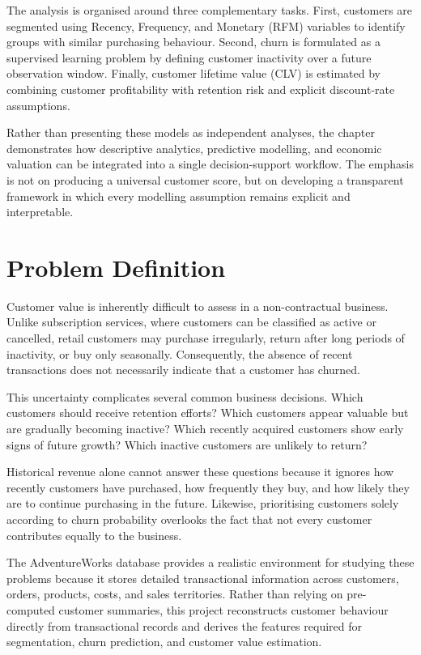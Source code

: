 \documentclass[
  12pt,
  letterpaper,
]{book}
\begin{document}
The analysis is organised around three complementary tasks. First,
customers are segmented using Recency, Frequency, and Monetary (RFM)
variables to identify groups with similar purchasing behaviour. Second,
churn is formulated as a supervised learning problem by defining
customer inactivity over a future observation window. Finally, customer
lifetime value (CLV) is estimated by combining customer profitability
with retention risk and explicit discount-rate assumptions.

Rather than presenting these models as independent analyses, the chapter
demonstrates how descriptive analytics, predictive modelling, and
economic valuation can be integrated into a single decision-support
workflow. The emphasis is not on producing a universal customer score,
but on developing a transparent framework in which every modelling
assumption remains explicit and interpretable.

\section{Problem Definition}\label{problem-definition-4}

Customer value is inherently difficult to assess in a non-contractual
business. Unlike subscription services, where customers can be
classified as active or cancelled, retail customers may purchase
irregularly, return after long periods of inactivity, or buy only
seasonally. Consequently, the absence of recent transactions does not
necessarily indicate that a customer has churned.

This uncertainty complicates several common business decisions. Which
customers should receive retention efforts? Which customers appear
valuable but are gradually becoming inactive? Which recently acquired
customers show early signs of future growth? Which inactive customers
are unlikely to return?

Historical revenue alone cannot answer these questions because it
ignores how recently customers have purchased, how frequently they buy,
and how likely they are to continue purchasing in the future. Likewise,
prioritising customers solely according to churn probability overlooks
the fact that not every customer contributes equally to the business.

The AdventureWorks database provides a realistic environment for
studying these problems because it stores detailed transactional
information across customers, orders, products, costs, and sales
territories. Rather than relying on pre-computed customer summaries,
this project reconstructs customer behaviour directly from transactional
records and derives the features required for segmentation, churn
prediction, and customer value estimation.
\end{document}
